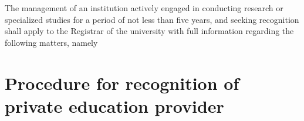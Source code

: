\documentclass[default]{mhact}
\begin{document}
    
      

      \begin{subsectionlist}
    

The management of an institution actively engaged in conducting research or specialized studies for a period of not less than five years, and seeking recognition shall apply to the Registrar of the university with full information regarding the following matters, namely

       \end{subsectionlist}
    
      \section{Procedure for recognition of private education provider}
      
\end{document}
